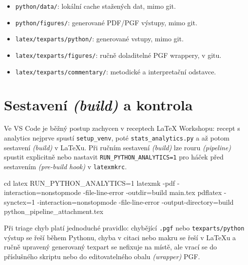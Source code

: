 \documentclass[
  a4paper, 10pt,
  master,
  final,
  notitlepage,
  noheader,
  nofrontmatter,
  noacro,
  nobibliography,
  nosoftware,
  nobackmatter,
  CTUend
]{CTUthesis}
\begin{document}
\begin{itemize}
  \item \texttt{python/data/}: lokální cache stažených dat, mimo git.
  \item \texttt{python/figures/}: generované PDF/PGF výstupy, mimo git.
  \item \texttt{latex/texparts/python/}: generované vstupy, mimo git.
  \item \texttt{latex/texparts/figures/}: ručně doladitelné PGF wrappery, v gitu.
  \item \texttt{latex/texparts/commentary/}: metodické a interpretační odstavce.
\end{itemize}

\section*{Sestavení \textit{(build)} a kontrola}
Ve VS Code je běžný postup zachycen v receptech LaTeX Workshopu: recept s
analytics nejprve spustí \texttt{setup\_venv}, poté \texttt{stats\_analytics.py}
a až potom sestavení \textit{(build)} v \LaTeX{}u. Při ručním sestavení
\textit{(build)} lze rouru \textit{(pipeline)} spustit explicitně nebo nastavit
\texttt{RUN\_PYTHON\_ANALYTICS=1} pro háček před sestavením \textit{(pre-build hook)}
v \texttt{latexmkrc}.

\begin{pipelinecode}
cd latex
RUN_PYTHON_ANALYTICS=1 latexmk -pdf -interaction=nonstopmode -file-line-error -outdir=build main.tex
pdflatex -synctex=1 -interaction=nonstopmode -file-line-error -output-directory=build python_pipeline_attachment.tex
\end{pipelinecode}

Při triage chyb platí jednoduché pravidlo: chybějící \texttt{.pgf} nebo
\texttt{texparts/python} výstup se řeší během Pythonu, chyba v citaci nebo makru
se řeší v \LaTeX{}u a ručně upravený generovaný texpart se nefixuje na místě,
ale vrací se do příslušného skriptu nebo do editovatelného obalu \textit{(wrapper)} PGF.
\end{document}
